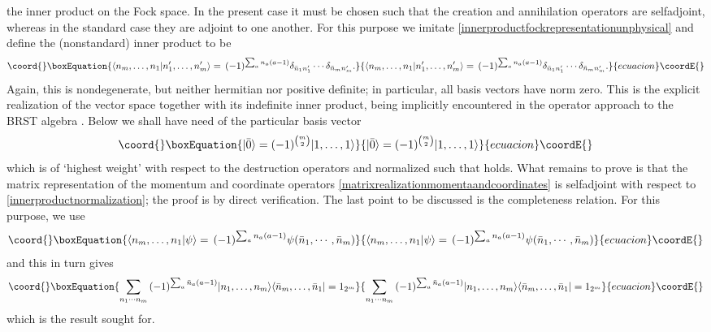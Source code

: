 \documentclass[a4paper,10pt]{article}
\begin{document}
the inner product on the Fock space. In the present case it must be chosen such that the 
creation and annihilation operators are selfadjoint, whereas in the standard case they 
are adjoint to one another. For this purpose we imitate 
\eqref{innerproductfockrepresentationunphysical} and define the (nonstandard) inner 
product to be
\begin{equation}\coord{}\boxEquation{\label{innerproductnormalization}
\langle n_m,\ldots,n_1|n^{\prime}_1,\ldots,n^{\prime}_m\rangle=\,(-1)^{\sum_{a}n_a(a-1)}
\delta_{\bar{n}_1n^{\prime}_1}\cdots\delta_{\bar{n}_mn^{\prime}_m}.
}{\langle n_m,\ldots,n_1|n^{\prime}_1,\ldots,n^{\prime}_m\rangle=\,(-1)^{\sum_{a}n_a(a-1)}
\delta_{\bar{n}_1n^{\prime}_1}\cdots\delta_{\bar{n}_mn^{\prime}_m}.
}{ecuacion}\coordE{}\end{equation}
Again, this is nondegenerate, but neither hermitian nor positive definite; in particular, 
all basis vectors have norm zero. This is the explicit realization of the vector space 
together with its indefinite inner product, being implicitly encountered in the operator 
approach to the BRST algebra \cite{Kugo 79,Nish 84}. Below we shall have need of the 
particular basis vector 
\begin{equation}\coord{}\boxEquation{\label{barzerorangle}
|\bar{0}\rangle=(-1)^{{m \choose 2}}|1,\ldots,1\rangle}{|\bar{0}\rangle=(-1)^{{m \choose 2}}|1,\ldots,1\rangle}{ecuacion}\coordE{}\end{equation}
which is of `highest weight' with respect to the destruction operators \coordHE{} and 
normalized such that \coordHE{} holds. What remains to prove is that the 
matrix representation of the momentum and coordinate operators 
\eqref{matrixrealizationmomentaandcoordinates} is selfadjoint with respect to 
\eqref{innerproductnormalization}; the proof is by direct verification. The last point to 
be discussed is the completeness relation. For this purpose, we use
\begin{equation}\coord{}\boxEquation{
\langle n_m,\ldots,n_1|\psi\rangle=\,(-1)^{\sum_{a}n_a(a-1)}
\psi(\bar{n}_1,\cdots,\bar{n}_m)
}{
\langle n_m,\ldots,n_1|\psi\rangle=\,(-1)^{\sum_{a}n_a(a-1)}
\psi(\bar{n}_1,\cdots,\bar{n}_m)
}{ecuacion}\coordE{}\end{equation}
and this in turn gives
\begin{equation}\coord{}\boxEquation{\label{completenessrelationfockbasisrealfermins}
\sum\limits_{n_1\cdots n_m}\,(-1)^{\sum_{a}\bar{n}_a(a-1)}|n_1,\ldots,n_m\rangle
\langle \bar{n}_m,\ldots,\bar{n}_1|=1_{2^m}
}{\sum\limits_{n_1\cdots n_m}\,(-1)^{\sum_{a}\bar{n}_a(a-1)}|n_1,\ldots,n_m\rangle
\langle \bar{n}_m,\ldots,\bar{n}_1|=1_{2^m}
}{ecuacion}\coordE{}\end{equation}
which is the result sought for.
\end{document}
